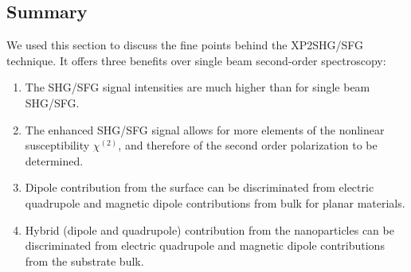 \subsection{Summary}
We used this section to discuss the fine points behind the XP2SHG/SFG technique. It offers three benefits over single beam second-order spectroscopy:

\begin{enumerate}
\item The SHG/SFG signal intensities are much higher than for single beam SHG/SFG.
\item The enhanced SHG/SFG signal allows for more elements of the nonlinear susceptibility $\chi^{(2)}$, and therefore of the second order polarization to be determined.
\item Dipole contribution from the surface can be discriminated from electric quadrupole and magnetic dipole contributions from bulk for planar materials.
\item Hybrid (dipole and quadrupole) contribution from the nanoparticles can be discriminated from electric quadrupole and magnetic dipole contributions from the substrate bulk.
\end{enumerate}
